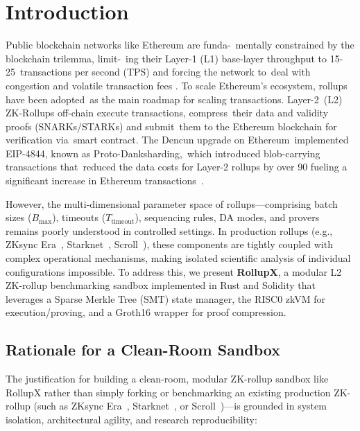 \section{Introduction}

Public blockchain networks like Ethereum are funda-\
mentally constrained by the blockchain trilemma, limit-\
ing their Layer-1 (L1) base-layer throughput to 15-25\
transactions per second (TPS) and forcing the network to\
deal with congestion and volatile transaction fees .
To scale Ethereum’s ecosystem, rollups have been adopted\
as the main roadmap for scaling transactions. Layer-2\
(L2) ZK-Rollups off-chain execute transactions, compress\
their data and validity proofs (SNARKs/STARKs) and submit\
them to the Ethereum blockchain for verification via\
smart contract. The Dencun upgrade on Ethereum\
implemented EIP-4844, known as Proto-Danksharding,\
which introduced blob-carrying transactions that\
reduced the data costs for Layer-2 rollups by over 90%
fueling a significant increase in Ethereum transactions~\cite{eip4844, l2beat_dencun, dune_eip4844}.

However, the multi-dimensional parameter space of rollups---comprising batch sizes (\(B_{\text{max}}\)), timeouts (\(T_{\text{timeout}}\)), sequencing rules, DA modes, and provers remains poorly understood in controlled settings. In production rollups (e.g., ZKsync Era~\cite{zksync_era_docs}, Starknet~\cite{starknet_docs}, Scroll~\cite{scroll_docs}), these components are tightly coupled with complex operational mechanisms, making isolated scientific analysis of individual configurations impossible. To address this, we present \textbf{RollupX}, a modular L2 ZK-rollup benchmarking sandbox implemented in Rust and Solidity that leverages a Sparse Merkle Tree (SMT) state manager, the RISC0 zkVM for execution/proving, and a Groth16 wrapper for proof compression.

\subsection{Rationale for a Clean-Room Sandbox}

The justification for building a clean-room, modular ZK-rollup sandbox like RollupX rather than simply forking or benchmarking an existing production ZK-rollup (such as ZKsync Era~\cite{zksync_era_docs}, Starknet~\cite{starknet_docs}, or Scroll~\cite{scroll_docs})---is grounded in system isolation, architectural agility, and research reproducibility:

